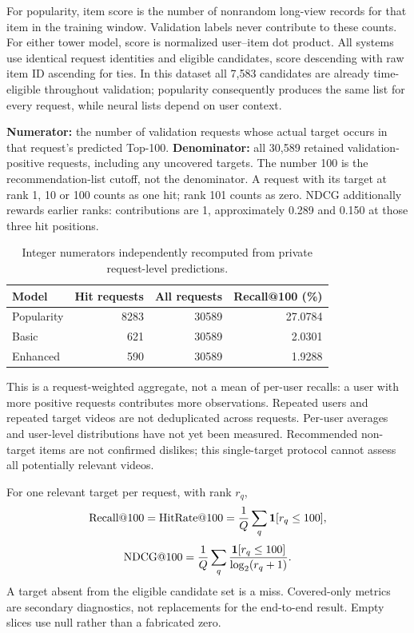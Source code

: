 \documentclass[11pt,a4paper]{article}
\begin{document}
For popularity, item score is the number of nonrandom long-view records for that item in the training window. Validation labels never contribute to these counts. For either tower model, score is normalized user--item dot product. All systems use identical request identities and eligible candidates, score descending with raw item ID ascending for ties. In this dataset all 7,583 candidates are already time-eligible throughout validation; popularity consequently produces the same list for every request, while neural lists depend on user context.

\textbf{Numerator:} the number of validation requests whose actual target occurs in that request's predicted Top-100. \textbf{Denominator:} all 30,589 retained validation-positive requests, including any uncovered targets. The number 100 is the recommendation-list cutoff, not the denominator. A request with its target at rank 1, 10 or 100 counts as one hit; rank 101 counts as zero. NDCG additionally rewards earlier ranks: contributions are 1, approximately 0.289 and 0.150 at those three hit positions.

\begin{table}[H]\centering\small\begin{tabular}{lrrr}\toprule
Model & Hit requests & All requests & Recall@100 (\%)\\\midrule
Popularity & 8283 & 30589 & 27.0784\\
Basic & 621 & 30589 & 2.0301\\
Enhanced & 590 & 30589 & 1.9288\\\bottomrule\end{tabular}
\caption{Integer numerators independently recomputed from private request-level predictions.}\end{table}
This is a request-weighted aggregate, not a mean of per-user recalls: a user with more positive requests contributes more observations. Repeated users and repeated target videos are not deduplicated across requests. Per-user averages and user-level distributions have not yet been measured. Recommended non-target items are not confirmed dislikes; this single-target protocol cannot assess all potentially relevant videos.

For one relevant target per request, with rank $r_q$,
\[\operatorname{Recall@100}=\operatorname{HitRate@100}={1\over Q}\sum_q\mathbf1[r_q\le100],\]
\[\operatorname{NDCG@100}={1\over Q}\sum_q{\mathbf1[r_q\le100]\over\log_2(r_q+1)}.\]
A target absent from the eligible candidate set is a miss. Covered-only metrics are secondary diagnostics, not replacements for the end-to-end result. Empty slices use null rather than a fabricated zero.
\end{document}

